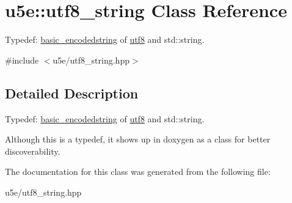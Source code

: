 \hypertarget{classu5e_1_1utf8__string}{}\section{u5e\+:\+:utf8\+\_\+string Class Reference}
\label{classu5e_1_1utf8__string}


Typedef\+: \hyperlink{classu5e_1_1basic__encodedstring}{basic\+\_\+encodedstring} of \hyperlink{classu5e_1_1utf8}{utf8} and std\+::string.  




{\ttfamily \#include $<$u5e/utf8\+\_\+string.\+hpp$>$}



\subsection{Detailed Description}
Typedef\+: \hyperlink{classu5e_1_1basic__encodedstring}{basic\+\_\+encodedstring} of \hyperlink{classu5e_1_1utf8}{utf8} and std\+::string. 

Although this is a typedef, it shows up in doxygen as a class for better discoverability. 

The documentation for this class was generated from the following file\+:\begin{DoxyCompactItemize}
\item 
u5e/utf8\+\_\+string.\+hpp\end{DoxyCompactItemize}
